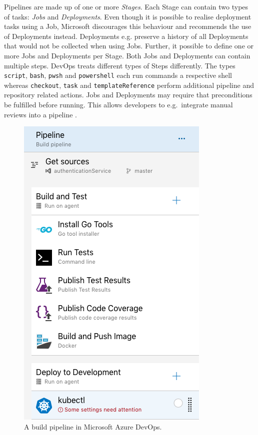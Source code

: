 Pipelines are made up of one or more \textit{Stages}. Each Stage can contain
two types of tasks: \textit{Jobs} and \textit{Deployments}. Even though it is
possible to realise deployment tasks using a Job, Microsoft discourages this
behaviour and recommends the use of Deployments instead. Deployments e.g.
preserve a history of all Deployments that would not be collected when using
Jobs.  Further, it possible to define one or more Jobs and Deployments per
Stage. Both Jobs and Deployments can contain multiple steps. DevOps treats
different types of Steps differently. The types \texttt{script}, \texttt{bash},
\texttt{pwsh} and \texttt{powershell} each run commands a respective shell
whereas \texttt{checkout}, \texttt{task} and \texttt{templateReference} perform
additional pipeline and repository related actions. Jobs and Deployments may
require that preconditions be fulfilled before running. This allows developers
to e.g.\ integrate manual reviews into a pipeline \autocite{MicrosoftJobs2019}.

\begin{figure}[H]
\begin{center}
  \includegraphics[scale=0.4]{images/figures/azure_devops_build_pipeline.png}
\end{center}
\caption{A build pipeline in Microsoft Azure DevOps.}%
\label{fig:build_pipeline_azure}
\end{figure}

